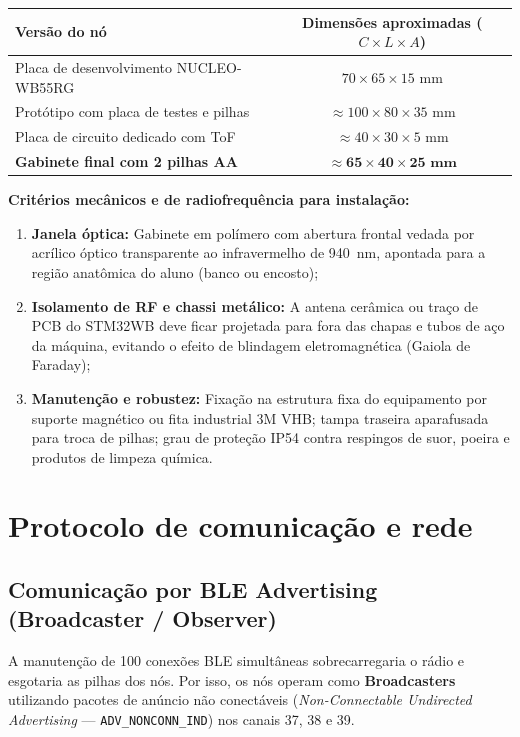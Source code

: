 \documentclass[11pt,a4paper]{article}
\begin{document}
\begin{center}
\small
\begin{tabular}{lc}
\toprule
\textbf{Versão do nó} & \textbf{Dimensões aproximadas ($C \times L \times A$)} \\
\midrule
Placa de desenvolvimento NUCLEO-WB55RG & $70 \times 65 \times 15\text{ mm}$ \\
Protótipo com placa de testes e pilhas & $\approx 100 \times 80 \times 35\text{ mm}$ \\
Placa de circuito dedicado com ToF & $\approx 40 \times 30 \times 5\text{ mm}$ \\
\textbf{Gabinete final com 2 pilhas AA} & $\mathbf{\approx 65 \times 40 \times 25\text{ mm}}$ \\
\bottomrule
\end{tabular}
\end{center}

\noindent\textbf{Critérios mecânicos e de radiofrequência para instalação:}
\begin{enumerate}
  \item \textbf{Janela óptica:} Gabinete em polímero com abertura frontal vedada por acrílico
        óptico transparente ao infravermelho de 940~nm, apontada para a região anatômica do
        aluno (banco ou encosto);
  \item \textbf{Isolamento de RF e chassi metálico:} A antena cerâmica ou traço de PCB do
        STM32WB deve ficar projetada para fora das chapas e tubos de aço da máquina, evitando
        o efeito de blindagem eletromagnética (Gaiola de Faraday);
  \item \textbf{Manutenção e robustez:} Fixação na estrutura fixa do equipamento por suporte
        magnético ou fita industrial 3M VHB; tampa traseira aparafusada para troca de pilhas;
        grau de proteção IP54 contra respingos de suor, poeira e produtos de limpeza química.
\end{enumerate}

\section{Protocolo de comunicação e rede}

\subsection{Comunicação por BLE Advertising (Broadcaster / Observer)}
A manutenção de 100 conexões BLE simultâneas sobrecarregaria o rádio e esgotaria as pilhas
dos nós. Por isso, os nós operam como \textbf{Broadcasters} utilizando pacotes de anúncio
não conectáveis (\emph{Non-Connectable Undirected Advertising} --- \texttt{ADV\_NONCONN\_IND})
nos canais 37, 38 e 39.
\end{document}
